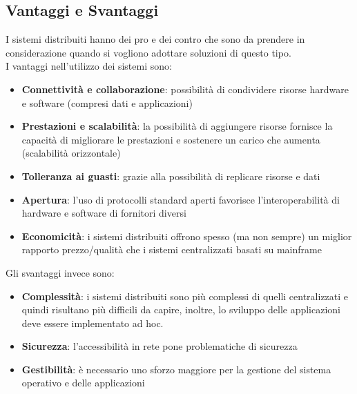 \subsection{Vantaggi e Svantaggi}
\label{subsec:vantaggi e svantaggi}
I sistemi distribuiti hanno dei pro e dei contro che sono da prendere in considerazione quando si vogliono adottare soluzioni di questo tipo.  
\\I vantaggi nell'utilizzo dei sistemi sono:
\begin{itemize}
\item \textbf{Connettività e collaborazione}: possibilità di condividere risorse hardware e software (compresi dati e applicazioni)
\item \textbf{Prestazioni e scalabilità}: la possibilità di aggiungere risorse fornisce la capacità di migliorare le prestazioni e sostenere un carico che aumenta (scalabilità orizzontale)
\item \textbf{Tolleranza ai guasti}: grazie alla possibilità di replicare risorse e dati
\item \textbf{Apertura}: l’uso di protocolli standard aperti favorisce l’interoperabilità di hardware e software di fornitori diversi
\item \textbf{Economicità}: i sistemi distribuiti offrono spesso (ma non sempre) un miglior rapporto prezzo/qualità che i sistemi centralizzati basati su mainframe
\end{itemize}

Gli svantaggi invece sono:
\begin{itemize}
\item \textbf{Complessità}: i sistemi distribuiti sono più complessi di quelli centralizzati e quindi risultano più difficili da capire, inoltre, lo sviluppo delle applicazioni deve essere implementato ad hoc.
\item \textbf{Sicurezza}: l’accessibilità in rete pone problematiche di sicurezza
\item \textbf{Gestibilità}: è necessario uno sforzo maggiore per la gestione del sistema operativo e delle applicazioni
\end{itemize}
